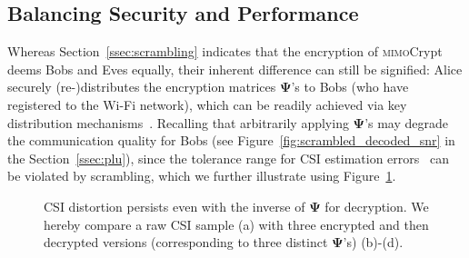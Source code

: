 \documentclass[conference,compsoc]{IEEEtran}
\newcommand{\sname}{\textsc{mimo}Crypt\xspace}
\begin{document}
\subsection{Balancing Security and Performance}
\label{ssec:optimization}
\vspace{-1ex}
%
Whereas Section~\ref{ssec:scrambling} indicates that the encryption of \sname deems Bobs and Eves equally, their inherent difference can still be signified: Alice securely (re-)distributes the encryption matrices $\bm{\Psi}$'s to Bobs (who have registered to the Wi-Fi network), which can be readily achieved via key distribution mechanisms~\cite{menezes2018handbook}.
%
Recalling that arbitrarily applying $\bm{\Psi}$'s may degrade the communication quality for Bobs (see Figure~\ref{fig:scrambled_decoded_snr} in the Section~\ref{ssec:plu}), 
since the tolerance range for CSI estimation errors~\cite{li2006effects} can be violated by scrambling, which we further illustrate using Figure~\ref{fig:csi_distortion}.
%
\begin{figure}[b]
	\setlength\abovecaptionskip{8pt}
	\vspace{-1ex}
	\centering
		\caption{CSI distortion persists even with the inverse of $\bm{\Psi}$ for decryption. We hereby compare a raw CSI sample (a) with three encrypted and then decrypted versions (corresponding to three distinct $\bm{\Psi}$'s) (b)-(d).}
	\label{fig:csi_distortion}
	\vspace{-.5ex}
\end{figure}
\end{document}
